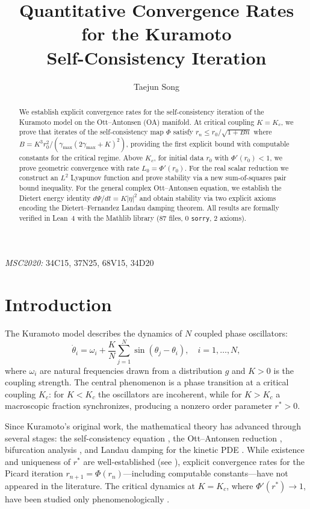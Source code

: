 \documentclass[12pt]{article}
\title{Quantitative Convergence Rates for the Kuramoto\\Self-Consistency Iteration}
\author{Taejun Song}
\date{}
\theoremstyle{definition}
\begin{document}
\maketitle

\noindent\textit{MSC2020:} 34C15, 37N25, 68V15, 34D20

\begin{abstract}
We establish explicit convergence rates for the self-consistency iteration
of the Kuramoto model on the Ott--Antonsen (OA) manifold.  At critical coupling
$K = K_c$, we prove that iterates of the self-consistency map $\Phi$ satisfy
$r_n \le r_0/\sqrt{1 + Bn}$ where $B = K^3 r_0^2/(\gamma_{\max}(2\gamma_{\max} + K)^2)$,
providing the first explicit bound with computable constants for the critical regime.
Above $K_c$, for initial data $r_0$ with $\Phi'(r_0) < 1$,
we prove geometric convergence with rate $L_0 = \Phi'(r_0)$.
For the real scalar reduction we construct an $L^2$ Lyapunov function
and prove stability via a new sum-of-squares pair bound inequality.
For the general complex Ott--Antonsen equation, we establish the Dietert
energy identity $d\Psi/dt = K|\eta|^2$ and obtain stability via
two explicit axioms encoding the Dietert--Fernandez Landau damping theorem.
All results are formally verified in Lean~4 with the Mathlib library
(87 files, 0 \texttt{sorry}, 2 axioms).
\end{abstract}

\section{Introduction}

The Kuramoto model \cite{kuramoto1975,kuramoto1984} describes the dynamics
of $N$ coupled phase oscillators:
\begin{equation}\label{eq:kuramoto}
\dot\theta_i = \omega_i + \frac{K}{N}\sum_{j=1}^N \sin(\theta_j - \theta_i), \quad i = 1,\ldots,N,
\end{equation}
where $\omega_i$ are natural frequencies drawn from a distribution $g$
and $K > 0$ is the coupling strength.  The central phenomenon is a phase
transition at a critical coupling $K_c$: for $K < K_c$ the oscillators
are incoherent, while for $K > K_c$ a macroscopic fraction synchronizes,
producing a nonzero order parameter $r^* > 0$.

Since Kuramoto's original work, the mathematical theory has advanced through
several stages: the self-consistency equation \cite{kuramoto1984,strogatz2000},
the Ott--Antonsen reduction \cite{ott2008,ott2009}, bifurcation analysis
\cite{chiba2015}, and Landau damping for the kinetic PDE
\cite{dietert2018,fernandez2016}.  While existence and uniqueness of $r^*$
are well-established (see \cite{acebron2005}), explicit convergence rates
for the Picard iteration $r_{n+1} = \Phi(r_n)$---including computable
constants---have not appeared in the literature.  The critical dynamics
at $K = K_c$, where $\Phi'(r^*) \to 1$, have been studied only
phenomenologically \cite{pazo2005}.
\end{document}
